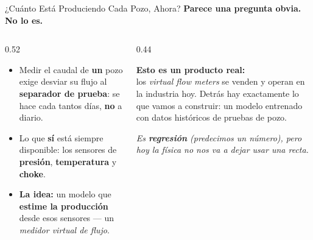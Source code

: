 \documentclass[aspectratio=169, 11pt]{beamer}
\begin{document}
\begin{frame}[shrink=8]{¿Cuánto Está Produciendo Cada Pozo, Ahora?}
  \vspace{-4pt}
  {\small\color{arcaDark}\bfseries
    Parece una pregunta obvia. No lo es.}

  \vspace{6pt}
  \begin{columns}[T]
    \begin{column}{0.52\textwidth}
      {\footnotesize\color{textMuted}
      \begin{itemize}\setlength{\itemsep}{6pt}
        \item[{\color{arcaRed}\scriptsize\faFlask}]
          Medir el caudal de \textbf{un} pozo exige desviar su flujo
          al \textbf{separador de prueba}: se hace cada tantos
          días, \textbf{no} a diario.
        \item[{\color{arcaRed}\scriptsize\faClock}]
          Lo que \textbf{sí} está siempre disponible: los sensores
          de \textbf{presión}, \textbf{temperatura} y \textbf{choke}.
        \item[{\color{codeGreen}\scriptsize\faLightbulb}]
          \textbf{La idea:} un modelo que \textbf{estime la producción}
          desde esos sensores --- un \textit{medidor virtual de flujo}.
      \end{itemize}
      }
    \end{column}
    \begin{column}{0.44\textwidth}
      \begin{tcolorbox}[colback=arcaGray, colframe=arcaRed, boxrule=0pt, leftrule=3pt,
        arc=3pt, left=6pt, right=6pt, top=5pt, bottom=5pt]
        {\scriptsize\color{arcaDark}\bfseries Esto es un producto real:}\\[4pt]
        {\scriptsize\color{textMuted}
          los \textit{virtual flow meters} se venden y operan
          en la industria hoy. Detrás hay exactamente
          lo que vamos a construir: un modelo entrenado
          con datos históricos de pruebas de pozo.}
      \end{tcolorbox}
      \vspace{5pt}
      {\scriptsize\color{textMuted}\itshape
        Es \textbf{regresión} (predecimos un número), pero
        hoy la física no nos va a dejar usar una recta.}
    \end{column}
  \end{columns}
\end{frame}
\end{document}
